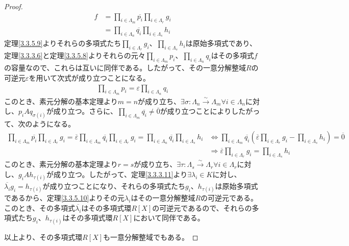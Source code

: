 \documentclass[dvipdfmx]{jsarticle}
\begin{document}
\begin{proof}
\begin{align*}
f &= \prod_{i \in \varLambda_{m}} \overline{p_{i}}\prod_{i \in \varLambda_{r}} g_{i} \\
&= \prod_{i \in \varLambda_{n}} \overline{q_{i}}\prod_{i \in \varLambda_{s}} h_{i}
\end{align*}
定理\ref{3.3.5.9}よりそれらの多項式たち$\prod_{i \in \varLambda_{r}} g_{i}$、$\prod_{i \in \varLambda_{s}} h_{i}$は原始多項式であり、定理\ref{3.3.3.6}と定理\ref{3.3.5.8}よりそれらの元々$\prod_{i \in \varLambda_{m}} p_{i}$、$\prod_{i \in \varLambda_{n}} q_{i}$はその多項式$f$の容量なので、これらは互いに同伴である。したがって、その一意分解整域$R$の可逆元$\varepsilon$を用いて次式が成り立つことになる。
\begin{align*}
\prod_{i \in \varLambda_{m}} p_{i} = \varepsilon\prod_{i \in \varLambda_{n}} q_{i}
\end{align*}
このとき、素元分解の基本定理より$m = n$が成り立ち、$\exists\sigma:\varLambda_{n}\overset{\sim}{\rightarrow}\varLambda_{m}\forall i \in \varLambda_{n}$に対し、$p_{i}Aq_{\sigma(i)}$が成り立つ。さらに、$\prod_{i \in \varLambda_{m}} \overline{q_{i}} \neq \overline{0}$が成り立つことによりしたがって、次のようになる。
\begin{align*}
\prod_{i \in \varLambda_{m}} \overline{p_{i}}\prod_{i \in \varLambda_{r}} g_{i} = \overline{\varepsilon}\prod_{i \in \varLambda_{m}} \overline{q_{i}}\prod_{i \in \varLambda_{r}} g_{i} = \prod_{i \in \varLambda_{n}} \overline{q_{i}}\prod_{i \in \varLambda_{s}} h_{i} &\Leftrightarrow \prod_{i \in \varLambda_{m}} \overline{q_{i}}\left( \overline{\varepsilon}\prod_{i \in \varLambda_{r}} g_{i} - \prod_{i \in \varLambda_{s}} h_{i} \right) = \overline{0}\\
&\Rightarrow \overline{\varepsilon}\prod_{i \in \varLambda_{r}} g_{i} = \prod_{i \in \varLambda_{s}} h_{i}
\end{align*}
このとき、素元分解の基本定理より$r = s$が成り立ち、$\exists\tau:\varLambda_{s}\overset{\sim}{\rightarrow}\varLambda_{r}\forall i \in \varLambda_{r}$に対し、$g_{i}Ah_{\tau(i)}$が成り立つ。したがって、定理\ref{3.3.3.11}より$\exists\lambda_{i} \in K$に対し、$\overline{\lambda_{i}}g_{i} = h_{\tau(i)}$が成り立つことになり、それらの多項式たち$g_{i}$、$h_{\tau(i)}$は原始多項式であるから、定理\ref{3.3.5.10}よりその元$\lambda_{i}$はその一意分解整域$R$の可逆元である。このとき、その多項式$\overline{\lambda_{i}}$はその多項式環$R[ X]$の可逆元であるので、それらの多項式たち$g_{i}$、$h_{\tau(i)}$はその多項式環$R[ X]$において同伴である。\par
以上より、その多項式環$R[ X]$も一意分解整域でもある。
\end{proof}
\end{document}
